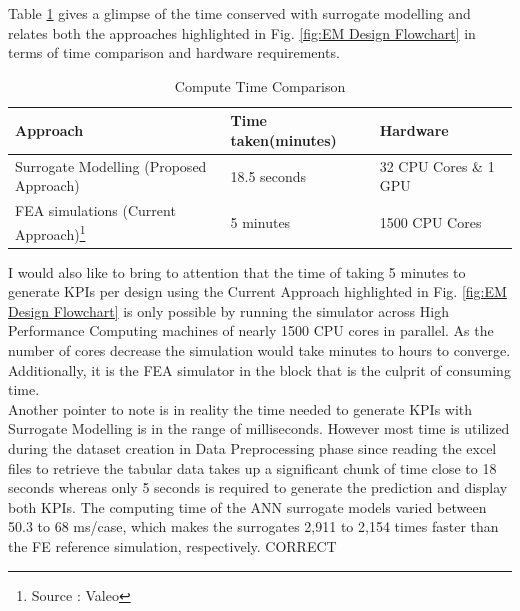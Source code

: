 \documentclass{report} %
\begin{document}
Table \ref{tab:Compute Time Comparisions} gives a glimpse of the time conserved with surrogate modelling and relates both the approaches highlighted in Fig. 
\ref{fig:EM Design Flowchart} in terms of time comparison and hardware requirements.

\begin{minipage}[t]{\textwidth}
    \begin{table}[H]
        \centering
        \begin{tabular}{|p{}|p{}|p{}|}
        \hline {\bf Approach} & {\bf Time taken(minutes)} & {\bf Hardware}\\
        \hline 
        Surrogate Modelling (Proposed Approach) & 18.5 seconds & 32 CPU Cores \& 1 GPU\\
        \ac{FEA} simulations (Current Approach)\footnote{Source : Valeo} & 5 minutes & 1500 CPU Cores\\
        \hline
        \end{tabular}
        \caption{Compute Time Comparison}
        \label{tab:Compute Time Comparisions}
    \end{table}
\end{minipage}

\vspace{1em} 

I would also like to bring to attention that the time of taking 5 minutes to generate \ac{KPI}s per design using the Current Approach highlighted in Fig. 
\ref{fig:EM Design Flowchart} is only possible by running the simulator across High Performance Computing machines of nearly 1500 CPU cores in parallel. 
As the number of cores decrease the simulation would take minutes to hours to converge. Additionally, it is the \ac{FEA} simulator in the block that is the culprit of 
consuming time. \\

Another pointer to note is in reality the time needed to generate \ac{KPI}s with Surrogate Modelling is in the range of milliseconds. 
However most time is utilized during the dataset creation in Data Preprocessing phase since reading the excel files to retrieve the tabular data takes up a 
significant chunk of time close to 18 seconds whereas only 5 seconds is required to generate the prediction and display both \ac{KPI}s.
The computing time of the \ac{ANN} surrogate models varied between 50.3 to 68 ms/case, which makes the surrogates 2,911 to 2,154 times faster than the FE reference simulation, 
respectively. CORRECT\\
\end{document}
